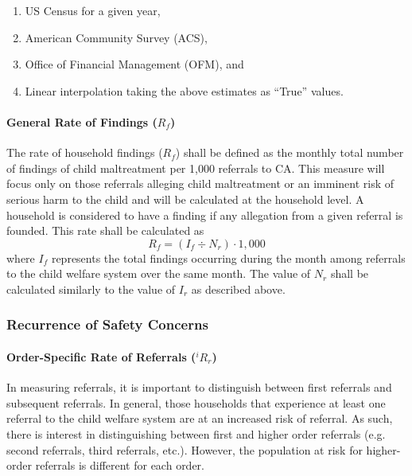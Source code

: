 \documentclass[12pt]{article}\usepackage[]{graphicx}\usepackage[]{color}
\begin{document}
\begin{enumerate}
  \item US Census for a given year,
  \item American Community Survey (ACS), 
  \item Office of Financial Management (OFM), and 
  \item Linear interpolation taking the above estimates as ``True'' values. 
\end{enumerate}

\paragraph{General Rate of Findings ($R_f$)}

The rate of household findings ($R_f$) shall be defined as the monthly total number of findings of child maltreatment per 1,000 referrals to CA. This measure will focus only on those referrals alleging child maltreatment or an imminent risk of serious harm to the child and will be calculated at the household level. A household is considered to have a finding if any allegation from a given referral is founded. This rate shall be calculated as 
\begin{equation}\label{eq:Rf}
R_f = (I_f \div N_r) \cdot 1,000
\end{equation}
where $I_f$ represents the total findings occurring during the month among referrals to the child welfare system over the same month. The value of $N_r$ shall be calculated similarly to the value of $I_r$ as described above. 


\subsubsection{Recurrence of Safety Concerns}

\paragraph{Order-Specific Rate of Referrals (${}^iR_r$)}

In measuring referrals, it is important to distinguish between first referrals and subsequent referrals. In general, those households that experience at least one referral to the child welfare system are at an increased risk of referral. As such, there is interest in distinguishing between first and higher order referrals (e.g. second referrals, third referrals, etc.). However, the population at risk for higher-order referrals is different for each order.
\end{document}
